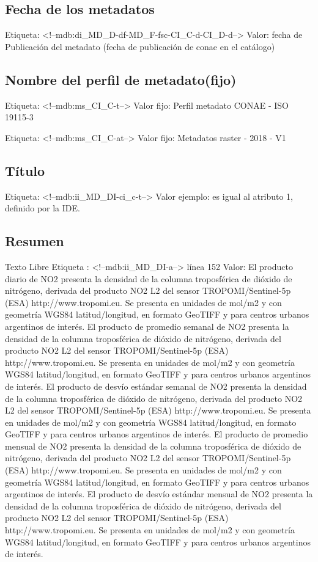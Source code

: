\documentclass{GVT_CONAE_Class}
\begin{document}
\subsection{Fecha de los metadatos}
Etiqueta: <!--mdb:di\_MD\_D-df-MD\_F-fsc-CI\_C-d-CI\_D-d-->
Valor: fecha de Publicación del metadato 
(fecha de publicación de conae en el catálogo)

\subsection{Nombre del perfil de metadato(fijo)}
Etiqueta: <!--mdb:ms\_CI\_C-t-->	
Valor fijo:  Perfil metadato CONAE - ISO 19115-3

Etiqueta: <!--mdb:ms\_CI\_C-at-->	
Valor fijo: Metadatos raster - 2018 - V1

\subsection{Título}
Etiqueta: <!--mdb:ii\_MD\_DI-ci\_c-t-->
Valor ejemplo: es igual al atributo 1, definido por la IDE.

\subsection{Resumen}
Texto Libre
Etiqueta : <!--mdb:ii\_MD\_DI-a--> línea 152
Valor: El producto diario de NO2 presenta la densidad de la columna troposférica de dióxido de nitrógeno, derivada del producto NO2 L2 del sensor TROPOMI/Sentinel-5p (ESA) http://www.tropomi.eu. Se presenta en unidades de mol/m2 y con geometría WGS84 latitud/longitud, en formato GeoTIFF y para centros urbanos argentinos de interés.
El producto de promedio semanal de NO2 presenta la densidad de la columna troposférica de dióxido de nitrógeno, derivada del producto NO2 L2 del sensor TROPOMI/Sentinel-5p (ESA) http://www.tropomi.eu. Se presenta en unidades de mol/m2 y con geometría WGS84 latitud/longitud, en formato GeoTIFF y para centros urbanos argentinos de interés. 
El producto de desvío estándar semanal de NO2 presenta la densidad de la columna troposférica de dióxido de nitrógeno, derivada del producto NO2 L2 del sensor TROPOMI/Sentinel-5p (ESA) http://www.tropomi.eu. Se presenta en unidades de mol/m2 y con geometría WGS84 latitud/longitud, en formato GeoTIFF y para centros urbanos argentinos de interés.
El producto de promedio mensual de NO2 presenta la densidad de la columna troposférica de dióxido de nitrógeno, derivada del producto NO2 L2 del sensor TROPOMI/Sentinel-5p (ESA) http://www.tropomi.eu. Se presenta en unidades de mol/m2 y con geometría WGS84 latitud/longitud, en formato GeoTIFF y para centros urbanos argentinos de interés.
El producto de desvío estándar mensual de NO2 presenta la densidad de la columna troposférica de dióxido de nitrógeno, derivada del producto NO2 L2 del sensor TROPOMI/Sentinel-5p (ESA) http://www.tropomi.eu. Se presenta en unidades de mol/m2 y con geometría WGS84 latitud/longitud, en formato GeoTIFF y para centros urbanos argentinos de interés.
\end{document}

